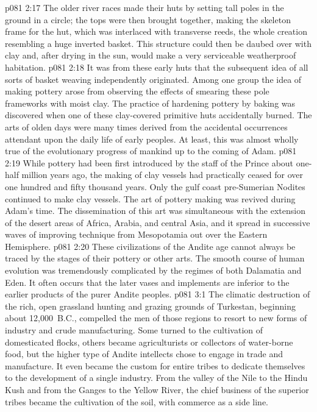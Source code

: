 \vs p081 2:17 The older river races made their huts by setting tall poles in the ground in a circle; the tops were then brought together, making the skeleton frame for the hut, which was interlaced with transverse reeds, the whole creation resembling a huge inverted basket. This structure could then be daubed over with clay and, after drying in the sun, would make a very serviceable weatherproof habitation.
\vs p081 2:18 It was from these early huts that the subsequent idea of all sorts of basket weaving independently originated. Among one group the idea of making pottery arose from observing the effects of smearing these pole frameworks with moist clay. The practice of hardening pottery by baking was discovered when one of these clay\hyp{}covered primitive huts accidentally burned. The arts of olden days were many times derived from the accidental occurrences attendant upon the daily life of early peoples. At least, this was almost wholly true of the evolutionary progress of mankind up to the coming of Adam.
\vs p081 2:19 While pottery had been first introduced by the staff of the Prince about one\hyp{}half million years ago, the making of clay vessels had practically ceased for over one hundred and fifty thousand years. Only the gulf coast pre\hyp{}Sumerian Nodites continued to make clay vessels. The art of pottery making was revived during Adam’s time. The dissemination of this art was simultaneous with the extension of the desert areas of Africa, Arabia, and central Asia, and it spread in successive waves of improving technique from Mesopotamia out over the Eastern Hemisphere.
\vs p081 2:20 These civilizations of the Andite age cannot always be traced by the stages of their pottery or other arts. The smooth course of human evolution was tremendously complicated by the regimes of both Dalamatia and Eden. It often occurs that the later vases and implements are inferior to the earlier products of the purer Andite peoples.
\vs p081 3:1 The climatic destruction of the rich, open grassland hunting and grazing grounds of Turkestan, beginning about 12,000~B.C., compelled the men of those regions to resort to new forms of industry and crude manufacturing. Some turned to the cultivation of domesticated flocks, others became agriculturists or collectors of water\hyp{}borne food, but the higher type of Andite intellects chose to engage in trade and manufacture. It even became the custom for entire tribes to dedicate themselves to the development of a single industry. From the valley of the Nile to the Hindu Kush and from the Ganges to the Yellow River, the chief business of the superior tribes became the cultivation of the soil, with commerce as a side line.
